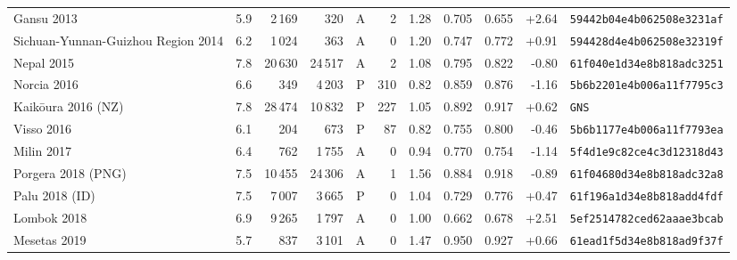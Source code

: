 \begin{longtable}{lrrrcrrrrrl}
Gansu 2013 & 5.9 & 2\,169 & 320 & A & 2 & 1.28 & 0.705 & 0.655 & +2.64 & \texttt{\scriptsize 59442b04e4b062508e3231af}\\
Sichuan-Yunnan-Guizhou Region 2014 & 6.2 & 1\,024 & 363 & A & 0 & 1.20 & 0.747 & 0.772 & +0.91 & \texttt{\scriptsize 594428d4e4b062508e32319f}\\
Nepal 2015 & 7.8 & 20\,630 & 24\,517 & A & 2 & 1.08 & 0.795 & 0.822 & -0.80 & \texttt{\scriptsize 61f040e1d34e8b818adc3251}\\
Norcia 2016 & 6.6 & 349 & 4\,203 & P & 310 & 0.82 & 0.859 & 0.876 & -1.16 & \texttt{\scriptsize 5b6b2201e4b006a11f7795c3}\\
Kaik\={o}ura 2016 (NZ) & 7.8 & 28\,474 & 10\,832 & P & 227 & 1.05 & 0.892 & 0.917 & +0.62 & \texttt{\scriptsize GNS}\\
Visso 2016 & 6.1 & 204 & 673 & P & 87 & 0.82 & 0.755 & 0.800 & -0.46 & \texttt{\scriptsize 5b6b1177e4b006a11f7793ea}\\
Milin 2017 & 6.4 & 762 & 1\,755 & A & 0 & 0.94 & 0.770 & 0.754 & -1.14 & \texttt{\scriptsize 5f4d1e9c82ce4c3d12318d43}\\
Porgera 2018 (PNG) & 7.5 & 10\,455 & 24\,306 & A & 1 & 1.56 & 0.884 & 0.918 & -0.89 & \texttt{\scriptsize 61f04680d34e8b818adc32a8}\\
Palu 2018 (ID) & 7.5 & 7\,007 & 3\,665 & P & 0 & 1.04 & 0.729 & 0.776 & +0.47 & \texttt{\scriptsize 61f196a1d34e8b818add4fdf}\\
Lombok 2018 & 6.9 & 9\,265 & 1\,797 & A & 0 & 1.00 & 0.662 & 0.678 & +2.51 & \texttt{\scriptsize 5ef2514782ced62aaae3bcab}\\
Mesetas 2019 & 5.7 & 837 & 3\,101 & A & 0 & 1.47 & 0.950 & 0.927 & +0.66 & \texttt{\scriptsize 61ead1f5d34e8b818ad9f37f}\\
\bottomrule
\end{longtable}
